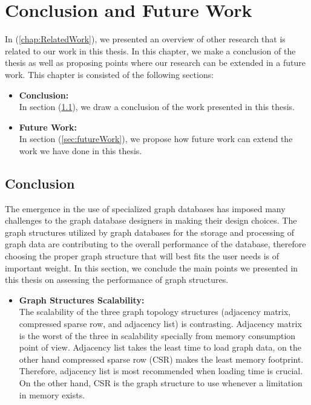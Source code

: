 {\chapter{Conclusion and Future Work}
\label{chap:Conclusion}

In (\ref{chap:RelatedWork}), we presented an overview of other research that is related to our work in this thesis. In this chapter, we make a conclusion of the thesis as well as proposing points where our research can be extended in a future work. This chapter is consisted of the following sections:

\begin{itemize}  

\item \textbf{Conclusion:}\\
In section (\ref{sec:Conclusion}), we draw a conclusion of the work presented in this thesis.

\item \textbf{Future Work:}\\
In section (\ref{sec:futureWork}), we propose how future work can extend the work we have done in this thesis.

\end{itemize}


\section{Conclusion}
\label{sec:Conclusion}

The emergence in the use of specialized graph databases has imposed many challenges to the graph database designers in making their design choices. The graph structures utilized by graph databases for the storage and processing of graph data are contributing to the overall performance of the database, therefore choosing the proper graph structure that will best fits the user needs is of important weight. In this section, we conclude the main points we presented in this thesis on assessing the performance of graph structures.


\begin{itemize}  

\item \textbf{Graph Structures Scalability:}\\
The scalability of the three graph topology structures (adjacency matrix, compressed sparse row, and adjacency list) is contrasting. Adjacency matrix is the worst of the three in scalability specially from memory consumption point of view. Adjacency list takes the least time to load graph data, on the other hand compressed sparse row (CSR) makes the least memory footprint. Therefore, adjacency list is most recommended when loading time is crucial. On the other hand, CSR is the graph structure to use whenever a limitation in memory exists.


\end{itemize}}
